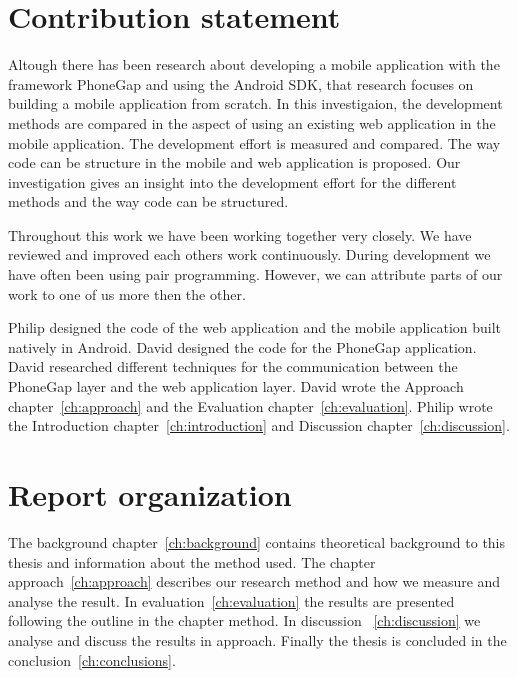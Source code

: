 \section{Contribution statement}\label{sec:contribution-statement}
Altough there has been research about developing a mobile application with the framework PhoneGap and using the Android SDK, that research focuses on building a mobile application from scratch. In this investigaion, the development methods are compared in the aspect of using an existing web application in the mobile application. The development effort is measured and compared. The way code can be structure in the mobile and web application is proposed. Our investigation gives an insight into the development effort for the different methods and the way code can be structured.

Throughout this work we have been working together very closely. We have reviewed and improved each others work continuously. During development we have often been using pair programming. However, we can attribute parts of our work to one of us more then the other.

Philip designed the code of the web application and the mobile application built natively in Android. David designed the code for the PhoneGap application. David researched different techniques for the communication between the PhoneGap layer and the web application layer. David wrote the Approach chapter~\ref{ch:approach} and the Evaluation chapter~\ref{ch:evaluation}. Philip wrote the Introduction chapter~\ref{ch:introduction} and Discussion chapter~\ref{ch:discussion}.

\section{Report organization}\label{sec:report-organization}
The background chapter~\ref{ch:background} contains theoretical background to this thesis and information about the method used. The chapter approach~\ref{ch:approach} describes our research method and how we measure and analyse the result. In evaluation~\ref{ch:evaluation} the results are presented following the outline in the chapter method. In discussion ~\ref{ch:discussion} we analyse and discuss the results in approach. Finally the thesis is concluded in the conclusion~\ref{ch:conclusions}.
